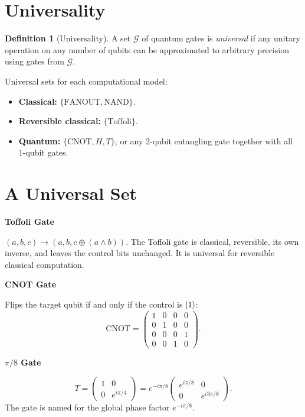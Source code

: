 \documentclass[12pt, a4paper, oneside]{report}
\theoremstyle{plain}
\theoremstyle{definition}
\newtheorem{definition}[theorem]{Definition}
\theoremstyle{remark}
\newcommand{\CNOT}{\mathrm{CNOT}}
\begin{document}
\section{Universality}

\begin{definition}[Universality]
A set $\mathcal{G}$ of quantum gates is \emph{universal} if any unitary operation on any
number of qubits can be approximated to arbitrary precision using gates from $\mathcal{G}$.
\end{definition}

Universal sets for each computational model:
\begin{itemize}
  \item \textbf{Classical:} $\{\text{FANOUT}, \text{NAND}\}$.
  \item \textbf{Reversible classical:} $\{\text{Toffoli}\}$.
  \item \textbf{Quantum:} $\{\CNOT, H, T\}$; or any 2-qubit entangling gate together with
        all 1-qubit gates.
\end{itemize}

\section{A Universal Set}



\textbf{Toffoli Gate}

$(a,b,c) \to (a, b, c \oplus (a \wedge b))$.
The Toffoli gate is classical, reversible, its own inverse, and leaves the control bits
unchanged. It is universal for reversible classical computation.

\textbf{CNOT Gate}

Flips the target qubit if and only if the control is $\ket{1}$:
\[
  \CNOT = \begin{pmatrix}1&0&0&0\\0&1&0&0\\0&0&0&1\\0&0&1&0\end{pmatrix}.
\]

\textbf{\texorpdfstring{$\pi/8$}{pi/8} Gate}

\[
  T = \begin{pmatrix}1 & 0 \\ 0 & e^{i\pi/4}\end{pmatrix}
    = e^{-i\pi/8}\begin{pmatrix}e^{i\pi/8} & 0 \\ 0 & e^{i3\pi/8}\end{pmatrix}.
\]
The gate is named for the global phase factor $e^{-i\pi/8}$.
\end{document}
